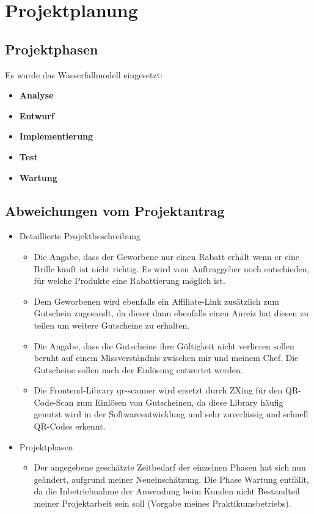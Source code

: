 \section{Projektplanung}
\label{sec:Projektplanung}

\subsection{Projektphasen}
\label{sec:Projektphasen}
Es wurde das Wasserfallmodell eingesetzt:
\begin{itemize}
  \item \textbf{Analyse}
  \item \textbf{Entwurf}
  \item \textbf{Implementierung}
  \item \textbf{Test}
  \item \textbf{Wartung}
\end{itemize}

\subsection{Abweichungen vom Projektantrag}
\label{sec:AbweichungenProjektantrag}

\begin{itemize}
  \item Detaillierte Projektbeschreibung
        \begin{itemize}
          \item Die Angabe, dass der Geworbene nur einen Rabatt erhält wenn er eine Brille kauft ist nicht richtig. Es wird vom Auftraggeber noch entschieden, für welche Produkte eine Rabattierung möglich ist.
          \item Dem Geworbenen wird ebenfalls ein Affiliate-Link zusätzlich zum Gutschein zugesandt, da dieser dann ebenfalls einen Anreiz hat diesen zu teilen um weitere Gutscheine zu erhalten.
          \item Die Angabe, dass die Gutscheine ihre Gültigkeit nicht verlieren sollen beruht auf einem Missverständnis zwischen mir und meinem Chef. Die Gutscheine sollen nach der Einlösung entwertet werden.
          \item Die Frontend-Library qr-scanner wird ersetzt durch \ac{ZXing} für den QR-Code-Scan zum Einlösen von Gutscheinen, da diese Library häufig genutzt wird in der Softwareentwicklung und sehr zuverlässig und schnell QR-Codes erkennt.
        \end{itemize}
  \item Projektphasen
        \begin{itemize}
          \item Der angegebene geschätzte Zeitbedarf der einzelnen Phasen hat sich nun geändert, aufgrund meiner Neueinschätzung. Die Phase Wartung entfällt, da die Inbetriebnahme der Anwendung beim Kunden nicht Bestandteil meiner Projektarbeit sein soll (Vorgabe meines Praktikumsbetriebs).
        \end{itemize}
\end{itemize}

